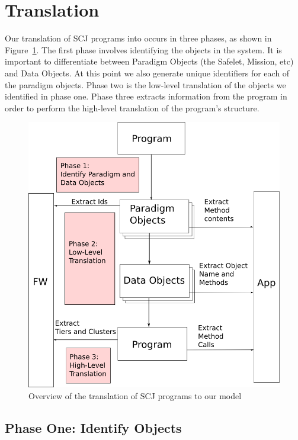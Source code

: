 \documentclass[10pt,a4paper]{article}
\begin{document}
\section{Translation}

Our translation of SCJ programs into \Circus{} occurs in three phases, as shown in Figure~\ref{tanslation}. The first phase involves identifying the objects in the system. It is important to differentiate between Paradigm Objects (the Safelet, Mission, etc) and Data Objects. At this point we also generate unique identifiers for each of the paradigm objects. Phase two is the low-level translation of the objects we identified in phase one. Phase three extracts information from the program in order to perform the high-level translation of the program's structure. 
\FloatBarrier
\begin{figure}[h!]
\begin{center}


\includegraphics[scale=0.4]{translation.png}
\caption{Overview of the translation of SCJ programs to our model \label{tanslation}}
\end{center}
\end{figure}

\subsection{Phase One: Identify Objects}
\end{document}
